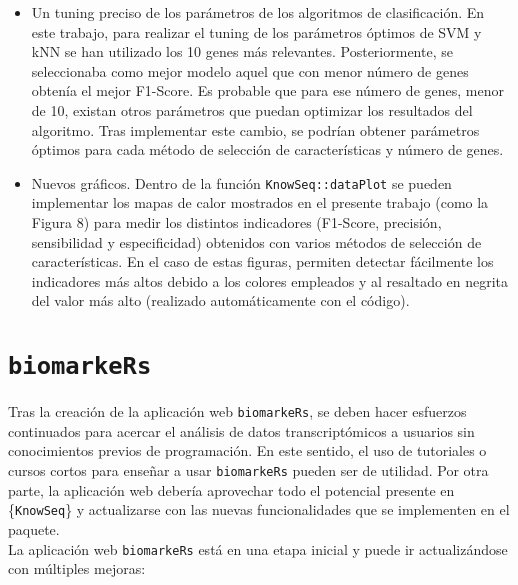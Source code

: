 \begin{itemize}
	\item Un tuning preciso de los parámetros de los algoritmos de clasificación. En este trabajo, para realizar el tuning de los parámetros óptimos de SVM y kNN se han utilizado los 10 genes más relevantes. Posteriormente, se seleccionaba como mejor modelo aquel que con menor número de genes obtenía el mejor F1-Score. Es probable que para ese número de genes, menor de 10, existan otros parámetros que puedan optimizar los resultados del algoritmo. Tras implementar este cambio, se podrían obtener parámetros óptimos para cada método de selección de características y número de genes.
	\item Nuevos gráficos. Dentro de la función \texttt{KnowSeq::dataPlot} se pueden implementar los mapas de calor mostrados en el presente trabajo (como la Figura 8) para medir los distintos indicadores (F1-Score, precisión, sensibilidad y especificidad) obtenidos con varios métodos de selección de características. En el caso de estas figuras, permiten detectar fácilmente los indicadores más altos debido a los colores empleados y al resaltado en negrita del valor más alto (realizado automáticamente con el código).
\end{itemize}

\section{\texttt{biomarkeRs}}

Tras la creación de la aplicación web \texttt{biomarkeRs}, se deben hacer esfuerzos continuados para acercar el análisis de datos transcriptómicos a usuarios sin conocimientos previos de programación. En este sentido, el uso de tutoriales o cursos cortos para enseñar a usar \texttt{biomarkeRs} pueden ser de utilidad. Por otra parte, la aplicación web debería aprovechar todo el potencial presente en \{\texttt{KnowSeq}\} y actualizarse con las nuevas funcionalidades que se implementen en el paquete.\\

La aplicación web \texttt{biomarkeRs} está en una etapa inicial y puede ir actualizándose con múltiples mejoras:

